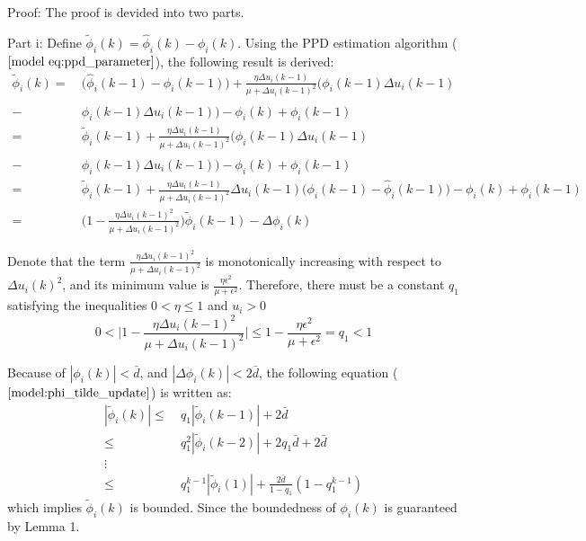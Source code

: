 \documentclass[journal,onecolumn]{IEEEtran}
\begin{document}
Proof: The proof is devided into two parts.

Part i: Define $\tilde{\phi}_i(k) = \hat{\phi}_i(k) - \phi_i(k)$. Using the PPD estimation algorithm ($\ref{model eq:ppd_parameter}$), the following result is derived:
\begin{align}
    \label{model:phi_tilde_update}
    \tilde{\phi}_i(k) = \ & \big( \hat{\phi}_i(k-1) - \phi_i(k-1) \big) + \frac{\eta \Delta u_i(k-1)}{\mu + \Delta u_i(k-1)^2} \big( \phi_i(k-1) \Delta u_i(k-1) \quad \nonumber \\
    - \ & \hat{\phi}_i(k-1) \Delta u_i(k-1)\big) - \phi_i(k) + \phi_i(k-1) \quad \nonumber \\
    = \ & \tilde{\phi}_i(k-1) + \frac{\eta \Delta u_i(k-1)}{\mu + \Delta u_i(k-1)^2} \big( \phi_i(k-1) \Delta u_i(k-1) \quad \nonumber \\
    - \ & \hat{\phi}_i(k-1) \Delta u_i(k-1)\big) - \phi_i(k) + \phi_i(k-1) \quad \nonumber \\
    = \ & \tilde{\phi}_i(k-1) + \frac{\eta \Delta u_i(k-1)}{\mu + \Delta u_i(k-1)^2} \Delta u_i(k-1) \big( \phi_i(k-1) - \hat{\phi}_i(k-1) \big) - \phi_i(k) + \phi_i(k-1) \quad \nonumber \\
    = \ & \bigg( 1 - \frac{\eta \Delta u_i(k-1)^2}{\mu + \Delta u_i(k-1)^2} \bigg) \tilde{\phi}_i(k-1) - \Delta \phi_i(k)
\end{align}


Denote that the term $ \frac{\eta \Delta u_i(k-1)^2}{\mu + \Delta u_i(k-1)^2} $ is monotonically increasing with respect to $ \Delta u_i(k)^2 $, and its minimum value is $ \frac{\eta \epsilon^2}{\mu + \epsilon^2} $. Therefore, there must be a constant $ q_1 $ satisfying the inequalities $ 0 < \eta \leq 1 $ and $ u_i > 0$
\begin{equation}
    \label{model eq:ineq}
    0 < \bigg |1 - \frac{\eta \Delta u_i(k-1)^2}{\mu + \Delta u_i(k-1)^2} \bigg| \leq 1 - \frac{\eta \epsilon^2}{\mu + \epsilon^2} = q_1 < 1 
\end{equation}

Because of $ |\phi_i(k)| < \bar{d} $, and $ |\Delta \phi_i(k)| < 2 \bar{d} $, the following equation ($ \ref{model:phi_tilde_update} $) is written as:
\begin{align}
    \label{model:absolute}
    |\tilde{\phi}_i(k)| \leq \ & q_1|\tilde{\phi}_i(k-1)| + 2 \bar{d} \quad \nonumber \\
    \leq \ & q_1^2|\tilde{\phi}_i(k-2)| + 2 q_1\bar{d} + 2\bar{d} \quad \nonumber \\
    \vdots \nonumber \\
    \leq \ & q_1^{k-1}|\tilde{\phi}_i(1)| + \frac{2 \bar{d}}{1-q_1}(1-q_1^{k-1})
\end{align} 
which implies $ \tilde{\phi}_i(k) $ is bounded. Since the boundedness of $ \phi_i(k) $ is guaranteed by Lemma 1. 
    
\end{document}
